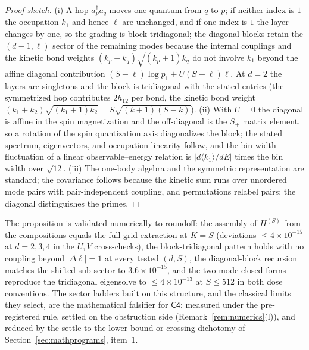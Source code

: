 \documentclass[11pt,a4paper]{article}
\theoremstyle{plain}
\theoremstyle{definition}
\theoremstyle{remark}
\begin{document}
\begin{proof}[Proof sketch]
(i) A hop $a_p^{\dagger}a_q$ moves one quantum from $q$ to $p$; if neither
index is $1$ the occupation $k_{1}$ and hence $\ell$ are unchanged, and if
one index is $1$ the layer changes by one, so the grading is
block-tridiagonal; the diagonal blocks retain the $(d-1,\ell)$ sector of the
remaining modes because the internal couplings and the kinetic bond weights
$(k_p+k_q)\sqrt{(k_p+1)k_q}$ do not involve $k_1$ beyond the affine diagonal
contribution $(S-\ell)\log p_{1}+U(S-\ell)\ell$. At $d=2$ the layers are
singletons and the block is tridiagonal with the stated entries (the
symmetrized hop contributes $2h_{12}$ per bond, the kinetic bond weight
$(k_1+k_2)\sqrt{(k_1+1)k_2}=S\sqrt{(k+1)(S-k)}$). (ii) With $U=0$ the
diagonal is affine in the spin magnetization and the off-diagonal is the
$S_{+}$ matrix element, so a rotation of the spin quantization axis
diagonalizes the block; the stated spectrum, eigenvectors, and occupation
linearity follow, and the bin-width fluctuation of a linear
observable--energy relation is $|d\langle k_1\rangle/dE|$ times the bin
width over $\sqrt{12}$. (iii) The one-body algebra and the symmetric
representation are standard; the covariance follows because the kinetic sum
runs over unordered mode pairs with pair-independent coupling, and
permutations relabel pairs; the diagonal distinguishes the primes.
\end{proof}

The proposition is validated numerically to roundoff: the assembly of
$H^{(S)}$ from the compositions equals the full-grid extraction at
$K=S$ (deviations $\leq4\times10^{-15}$ at $d=2,3,4$ in the $U,V$
cross-checks), the block-tridiagonal pattern holds with no coupling beyond
$|\Delta\ell|=1$ at every tested $(d,S)$, the diagonal-block recursion
matches the shifted sub-sector to $3.6\times10^{-15}$, and the two-mode
closed forms reproduce the tridiagonal eigensolve to
$\leq4\times10^{-13}$ at $S\le512$ in both dose conventions. The sector
ladders built on this structure, and the classical limits they select, are the
mathematical falsifier for $\mathsf{C4}$: measured under the pre-registered rule,
settled on the obstruction side (Remark~\ref{rem:numerics}(l)), and reduced by the
settle to the lower-bound-or-crossing dichotomy of
Section~\ref{sec:mathprograms}, item~1.
\end{document}

